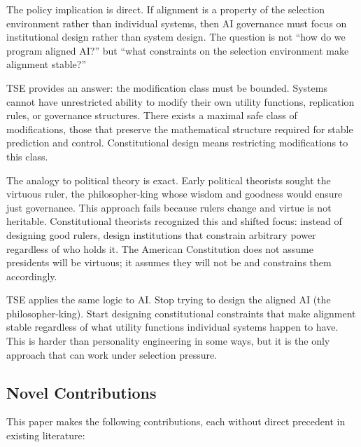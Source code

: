 \documentclass[12pt]{article}
\begin{document}
The policy implication is direct. If alignment is a property of the selection environment rather than individual systems, then AI governance must focus on institutional design rather than system design. The question is not ``how do we program aligned AI?'' but ``what constraints on the selection environment make alignment stable?''

TSE provides an answer: the modification class must be bounded. Systems cannot have unrestricted ability to modify their own utility functions, replication rules, or governance structures. There exists a maximal safe class of modifications, those that preserve the mathematical structure required for stable prediction and control. Constitutional design means restricting modifications to this class.

The analogy to political theory is exact. Early political theorists sought the virtuous ruler, the philosopher-king whose wisdom and goodness would ensure just governance. This approach fails because rulers change and virtue is not heritable. Constitutional theorists recognized this and shifted focus: instead of designing good rulers, design institutions that constrain arbitrary power regardless of who holds it. The American Constitution does not assume presidents will be virtuous; it assumes they will not be and constrains them accordingly.

TSE applies the same logic to AI. Stop trying to design the aligned AI (the philosopher-king). Start designing constitutional constraints that make alignment stable regardless of what utility functions individual systems happen to have. This is harder than personality engineering in some ways, but it is the only approach that can work under selection pressure.


\subsection{Novel Contributions}
\label{sec:contributions}

This paper makes the following contributions, each without direct precedent in existing literature:
\end{document}
